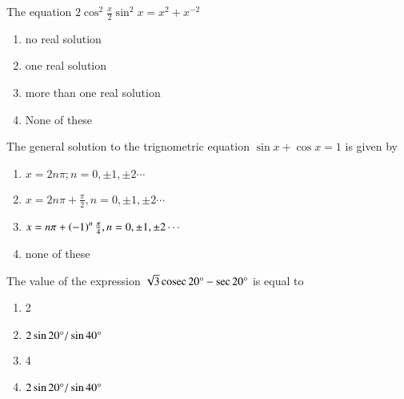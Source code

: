 	\item The equation $2\cos^{2}\frac{x}{2}\sin^{2}x = x^{2} +x^{-2}$  
		\hfill{}
      
		\begin{enumerate}
			\item no real solution
	  		\item one real solution
			\item more than one real solution 
			\item None of these
		\end{enumerate}
  


	\item The general solution to the trignometric equation $ \sin x + \cos x = 1$ is given by
		\hfill{}
  
		\begin{enumerate}
			\item $x=2n\pi;n=0,\pm1,\pm2 \cdots$
			\item  $x = 2n\pi + \frac{\pi}{2}, n = 0, \pm 1, \pm 2 \cdots $
			\item $x=n\pi+\left(-1\right)^{n}\frac{\pi}{4},n = 0,\pm 1,\pm 2 \cdots $ 
			\item none of these
		\end{enumerate}
  


	\item The value of the expression $\sqrt{3}\,\text{cosec}\, 20\degree - \sec 20\degree $ is equal to 
		\hfill{}
  
			\begin{enumerate}
				\item 2 
  				\item $2\sin 20\degree/\sin 40\degree$
  				\item 4 
				\item $2\sin 20\degree/\sin 40\degree $
			\end{enumerate}
  
  
